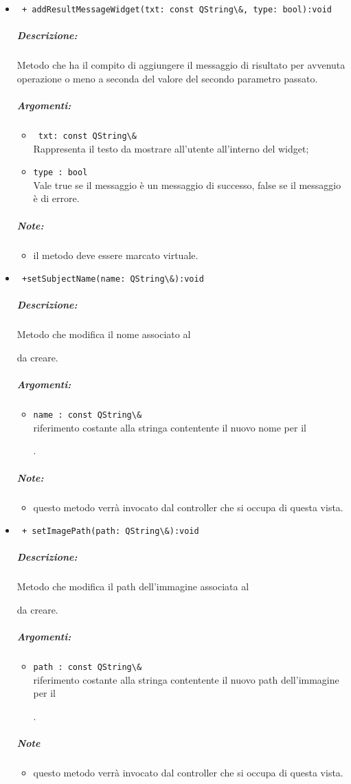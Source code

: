 \begin{itemize}
\item \color{blue} \verb! + addResultMessageWidget(txt: const QString\&, type: bool):void!
\color{black}
\subparagraph{Descrizione:} Metodo che ha il compito di aggiungere il messaggio di risultato per avvenuta operazione o meno a seconda del valore del secondo parametro passato.
\subparagraph{Argomenti:}
\begin{itemize}
\item \color{RoyalPurple} \verb! txt: const QString\& ! \\Rappresenta il testo da mostrare all'utente all'interno del widget;
\item \color{RoyalPurple} \verb!type : bool ! \\ Vale true se il messaggio è un messaggio di successo, false se il messaggio è di errore.
\end{itemize}
\subparagraph{Note:}
\begin{itemize}
\item il metodo deve essere marcato virtuale.
\end{itemize}
 
\item \color{blue}\verb! +setSubjectName(name: QString\&):void!
\color{black}
\subparagraph{Descrizione: }
Metodo che modifica il nome associato al \subject{} da creare.
 \subparagraph{Argomenti:}
 \begin{itemize}
\item \color{RoyalPurple} \verb!name : const QString\& !\\ riferimento costante alla stringa contentente il nuovo nome per il \subject{}.
\end{itemize}
 \subparagraph{Note:}
 \begin{itemize}
 \item questo metodo verrà invocato dal controller che si occupa di questa vista.
 \end{itemize}
 
\item \color{blue}\verb! + setImagePath(path: QString\&):void !
\color{black} 
\subparagraph{Descrizione: }Metodo che modifica il path dell'immagine associata al \subject{} da creare. \\
  \subparagraph{Argomenti:}
 \begin{itemize}
\item \color{RoyalPurple} \verb!path : const QString\& !\\ riferimento costante alla stringa contentente il nuovo path dell'immagine per il \subject{}.
\end{itemize} 
 \subparagraph{Note}
 \begin{itemize}
 \item questo metodo verrà invocato dal controller che si occupa di questa vista.
 \end{itemize}


\end{itemize}
